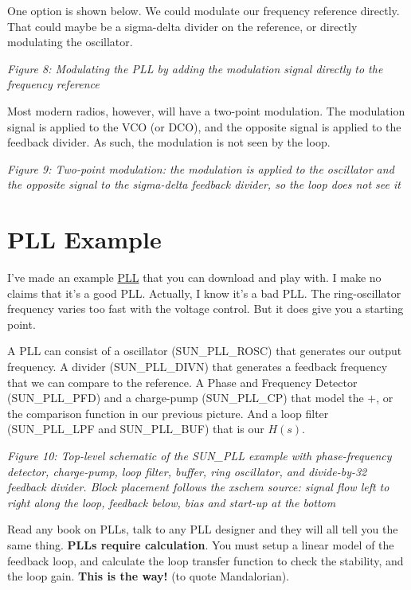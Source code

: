 One option is shown below. We could modulate our frequency reference
directly. That could maybe be a sigma-delta divider on the reference, or
directly modulating the oscillator.


{
\centering
{}
}

\emph{Figure 8: Modulating the PLL by adding the modulation signal
directly to the frequency reference}

Most modern radios, however, will have a two-point modulation. The
modulation signal is applied to the VCO (or DCO), and the opposite
signal is applied to the feedback divider. As such, the modulation is
not seen by the loop.


{
\centering
{}
}

\emph{Figure 9: Two-point modulation: the modulation is applied to the
oscillator and the opposite signal to the sigma-delta feedback divider,
so the loop does not see it}

\section{PLL Example}\label{pll-example}

I've made an example
\href{https://github.com/wulffern/sun_pll_sky130nm}{PLL} that you can
download and play with. I make no claims that it's a good PLL. Actually,
I know it's a bad PLL. The ring-oscillator frequency varies too fast
with the voltage control. But it does give you a starting point.

A PLL can consist of a oscillator (SUN\_PLL\_ROSC) that generates our
output frequency. A divider (SUN\_PLL\_DIVN) that generates a feedback
frequency that we can compare to the reference. A Phase and Frequency
Detector (SUN\_PLL\_PFD) and a charge-pump (SUN\_PLL\_CP) that model the
\(+\), or the comparison function in our previous picture. And a loop
filter (SUN\_PLL\_LPF and SUN\_PLL\_BUF) that is our \(H(s)\).


{
\centering
{}
}

\emph{Figure 10: Top-level schematic of the SUN\_PLL example with
phase-frequency detector, charge-pump, loop filter, buffer, ring
oscillator, and divide-by-32 feedback divider. Block placement follows
the xschem source: signal flow left to right along the loop, feedback
below, bias and start-up at the bottom}

Read any book on PLLs, talk to any PLL designer and they will all tell
you the same thing. \textbf{PLLs require calculation}. You must setup a
linear model of the feedback loop, and calculate the loop transfer
function to check the stability, and the loop gain. \textbf{This is the
way!} (to quote Mandalorian).


